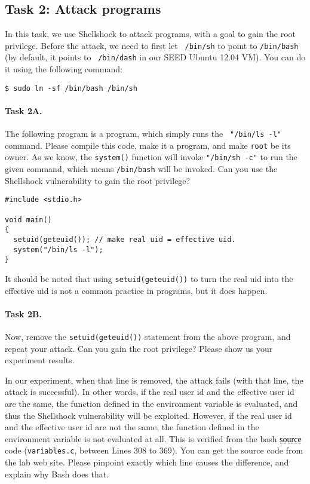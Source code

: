 \subsection{Task 2: Attack \setuid programs}

In this task, we use Shellshock to attack \setuid programs, with a goal to
gain the root privilege. Before the attack, we need to first let {\tt
/bin/sh} to point to {\tt /bin/bash} (by default, it points to {\tt
/bin/dash} in our SEED Ubuntu 12.04 VM). You can do it using the following command:

\begin{Verbatim}[frame=single]
$ sudo ln -sf /bin/bash /bin/sh
\end{Verbatim}



\paragraph{Task 2A.}
The following program is a \setuid program, which simply runs the {\tt
"/bin/ls -l"} command. Please compile this code, make it a \setuid
program, and make {\tt root} be its owner.
As we know, the {\tt system()} function will invoke
{\tt "/bin/sh -c"} to run the given command, which means {\tt /bin/bash} will
be invoked. Can you use the Shellshock vulnerability to 
gain the root privilege? 


\begin{Verbatim}[frame=single]
#include <stdio.h>

void main()
{
  setuid(geteuid()); // make real uid = effective uid.
  system("/bin/ls -l");
}
\end{Verbatim}

It should be noted that using {\tt setuid(geteuid())} to turn the real uid
into the effective uid is not a common practice in \setuid programs, but it
does happen. 


\paragraph{Task 2B.}
Now, remove the {\tt setuid(geteuid())} statement from the above program,
and repeat your attack. Can you gain the root privilege? Please show us
your experiment results.

In our experiment, when that line is removed, the attack fails (with that
line, the attack is successful). In other words, if the real user id and
the effective user id are the same, the function defined in the environment
variable is evaluated, and thus the Shellshock vulnerability will be exploited.
However, if the real user id and the effective user id are not the same,
the function defined in the environment variable is not evaluated at all.
This is verified from the bash s̠o̠u̠r̠c̠e̠ code ({\tt variables.c}, between
Lines 308 to 369). You can get the source code from the lab web site. 
Please pinpoint exactly which line causes the difference, and explain
why Bash does that. 


